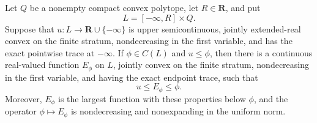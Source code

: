 \begin{lemma}
\label{lem:p071-terminal-polyhedral-insertion}
Let \(Q\) be a nonempty compact convex polytope, let \(R\in\mathbf R\), and
put
\[
                       L=[-\infty,R]\times Q.
\]
Suppose that \(u:L\to\mathbf R\cup\{-\infty\}\) is upper semicontinuous,
jointly extended-real convex on the finite stratum, nondecreasing in the
first variable, and has the exact pointwise trace at \(-\infty\).  If
\(\phi\in C(L)\) and \(u\leq\phi\), then there is a continuous real-valued
function \(E_\phi\) on \(L\), jointly convex on the finite stratum,
nondecreasing in the first variable, and having the exact endpoint trace,
such that
\begin{equation}
                             u\leq E_\phi\leq\phi.
 \label{eq:p071-terminal-insertion-sandwich}
\end{equation}
Moreover, \(E_\phi\) is the largest function with these properties below
\(\phi\), and the operator \(\phi\mapsto E_\phi\) is nondecreasing and
nonexpanding in the uniform norm.
\end{lemma}

